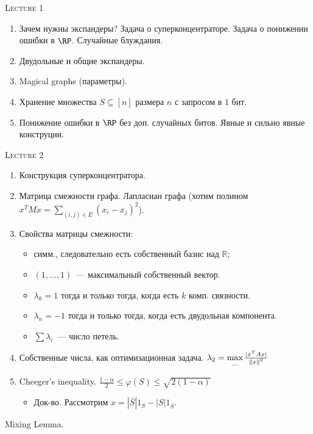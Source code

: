 \centerline{\textsc{Lecture 1}}

\begin{enumerate}
    \item Зачем нужны экспандеры? Задача о суперконцентраторе. Задача о понижении ошибки в
        $\RP$. Случайные блуждания.
    \item Двудольные и общие экспандеры.
    \item Magical graphs (параметры).
    \item Хранение множества $S \subseteq [n]$ размера $n$ с запросом в $1$ бит.
    \item Понижение ошибки в $\RP$ без доп. случайных битов. Явные и сильно явные конструции.
\end{enumerate}


\centerline{\textsc{Lecture 2}}

\begin{enumerate}
    \item Конструкция суперконцентратора.
    \item Матрица смежности графа. Лапласиан графа (хотим полином $x^T M x = \sum\limits_{(i, j) \in E} (x_i - x_j)^2$).
    \item Свойства матрицы смежности:
        \begin{itemize}
            \item симм., следовательно есть собственный базис над $\mathbb{R}$;
            \item $(1, \dots, 1)$~--- максимальный собственный вектор.
            \item $\lambda_k = 1$ тогда и только тогда, когда есть $k$ комп. связности.
            \item $\lambda_n = -1$ тогда и только тогда, когда есть двудольная компонента.
            \item $\sum \lambda_i$~--- число петель.
        \end{itemize}
    \item Собственные числа, как оптимизационная задача. $\lambda_2 = \max\limits_{...} \frac{|x^T A x|}{\left\lVert x\right\rVert^2}$
    \item Cheeger's inequality. $\frac{1 - \alpha}{2} \le \varphi(S) \le \sqrt{2 (1 - \alpha)}$
        \begin{itemize}
            \item Док-во. Рассмотрим $x = |\bar{S}| 1_S - |S| 1_{\bar{S}}$.
        \end{itemize}
\end{enumerate}


    \item Mixing Lemma.